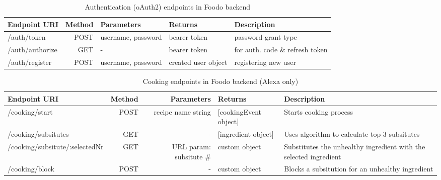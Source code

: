 \begin{table}[!ht]
	\hspace{-5pt}
	\begin{scriptsize}
		\begin{tabularx}{\textwidth + 5pt}{| @{\hspace{3pt}} M | @{\hspace{3pt}} N | @{\hspace{3pt}} M | @{\hspace{3pt}} M | @{\hspace{3pt}} B |}
		\hline
		\textbf{Endpoint URI} & \textbf{Method} & \textbf{Parameters} & \textbf{Returns} & \textbf{Description}\\
		\hline
		/auth/token & POST & username, password  & bearer token & password grant type \\
		\hline
		/auth/authorize & GET & -  & bearer token & for auth. code \& refresh token \\
		\hline
		/auth/register & POST & username, password  & created user object & registering new user \\
		\hline
	\end{tabularx}
	\end{scriptsize}
	\caption{Authentication (oAuth2) endpoints in Foodo backend}
	\vspace{1em}
\end{table}

\begin{table}[!ht]
	\hspace{-5pt}
	\begin{scriptsize}
		\begin{tabularx}{\textwidth + 5pt}{| @{\hspace{3pt}} H | @{\hspace{3pt}} N | @{\hspace{3pt}} N | @{\hspace{3pt}} O | @{\hspace{3pt}} B |}
			\hline
			\textbf{Endpoint URI} & \textbf{Method} & \textbf{Parameters} & \textbf{Returns} & \textbf{Description}\\
			\hline
			/cooking/start \lockicon & POST & recipe name string &  [cookingEvent object] & Starts cooking process \\
			\hline
			/cooking/subsitutes \lockicon & GET & -  &  [ingredient object] & Uses algorithm to calculate top 3 subsitutes \\
			\hline
			/cooking/subsitute/:selectedNr \lockicon & GET & URL param: subsitute \#  &  custom object & Substitutes the unhealthy ingredient with the selected ingredient \\
			\hline
			/cooking/block \lockicon & POST & -  &  custom object & Blocks a subsitution for an unhealthy ingredient \\
			\hline
		\end{tabularx}
	\end{scriptsize}
	\caption{Cooking endpoints in Foodo backend (Alexa only) }
\end{table}

